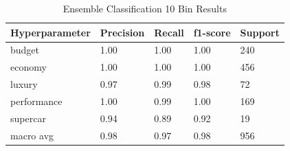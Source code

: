 \documentclass{article}
\begin{document}
\begin{table}[h]
\centering
\caption{Ensemble Classification 10 Bin Results}
\vspace{3pt}
\label{tab:hyperparameters}
\begin{tabular}{|l|l|l|l|l|}
\hline
\textbf{Hyperparameter} & \textbf{Precision} & \textbf{Recall} & \textbf{f1-score} & \textbf{Support} \\
\hline
      budget &     1.00 &     1.00 &     1.00  &     240 \\
      \hline
     economy &      1.00 &     1.00 &     1.00  &     456 \\
     \hline
      luxury &      0.97 &     0.99 &     0.98  &      72 \\
      \hline
    performance &      1.00 &     0.99 &     1.00   &    169 \\
     \hline
    supercar &      0.94 &     0.89 &     0.92  &      19 \\
    \hline
   macro avg &      0.98 &     0.97 &     0.98 &      956 \\
   

\hline
\end{tabular}
\end{table}
\end{document}
